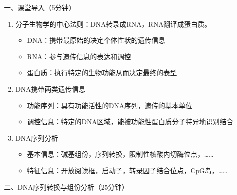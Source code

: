 \documentclass{TIJMUjiaoanLL}
\begin{document}
\firstTail


\newpage
\otherHeader

\noindent
一、课堂导入（5分钟）
\begin{enumerate}
	\item 分子生物学的中心法则：DNA转录成RNA，RNA翻译成蛋白质。
		\begin{itemize}
			\item DNA：携带最原始的决定个体性状的遗传信息
			\item RNA：参与遗传信息的表达和调控
			\item 蛋白质：执行特定的生物功能从而决定最终的表型
		\end{itemize}
	\item DNA携带两类遗传信息
		\begin{itemize}
			\item 功能序列：具有功能活性的DNA序列，遗传的基本单位
			\item 调控信息：特定的DNA区域，能被功能性蛋白质分子特异地识别结合
		\end{itemize}
	\item DNA序列分析
		\begin{itemize}
			\item 基本信息：碱基组份，序列转换，限制性核酸内切酶位点，……
			\item 特征信息：开放阅读框，启动子，转录因子结合位点，CpG岛，……
		\end{itemize}
\end{enumerate}

\noindent
二、DNA序列转换与组份分析（25分钟）
\end{document}
